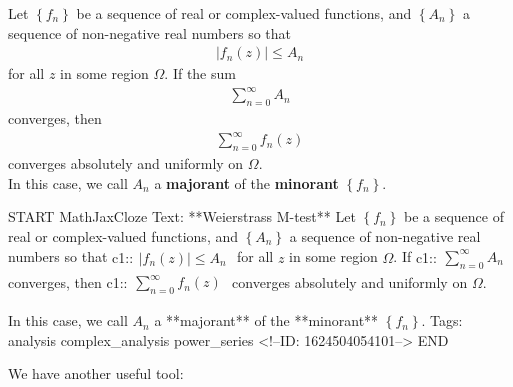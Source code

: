 \documentclass{memoir}
\begin{document}
\begin{thm}
	Let \(\left\{ f_n \right\} \) be a sequence of real or complex-valued functions, and \(\left\{ A_n \right\} \) a sequence of non-negative real numbers so that
	\begin{align*}
		\left| f_n(z) \right| \leq A_n
	\end{align*}
	for all \(z\) in some region \(\Omega\). If the sum
	\begin{align*}
		\sum_{n=0}^{\infty} A_n
	\end{align*}
	converges, then
	\begin{align*}
		\sum_{n=0}^{\infty} f_n(z)
	\end{align*}
	converges absolutely and uniformly on \(\Omega\).\\

	In this case, we call \(A_n\) a \textbf{majorant} of the \textbf{minorant} \(\left\{ f_n \right\} \). 
\end{thm}

\begin{anki}
START
MathJaxCloze
Text: **Weierstrass M-test**
	Let \(\left\{ f_n \right\} \) be a sequence of real or complex-valued functions, and \(\left\{ A_n \right\} \) a sequence of non-negative real numbers so that
	{{c1::\(\begin{align*}
	        	\left| f_n(z) \right| \leq A_n
	        \end{align*}\)}} 
	for all \(z\) in some region \(\Omega\). If
	{{c1::\(\begin{align*}
	        	\sum_{n=0}^{\infty} A_n
	        \end{align*}\)}} 
	converges, then
	{{c1::\(\begin{align*}
	        	\sum_{n=0}^{\infty} f_n(z)
	        \end{align*}\)}} 
	converges absolutely and uniformly on \(\Omega\).

In this case, we call \(A_n\) a **majorant** of the **minorant** \(\left\{ f_n \right\} \). 
Tags: analysis complex_analysis power_series
<!--ID: 1624504054101-->
END
\end{anki}


We have another useful tool:
\end{document}
